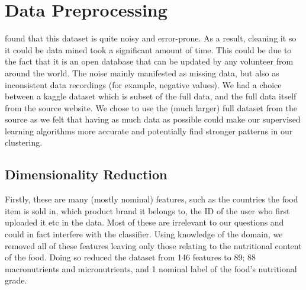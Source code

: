\documentclass[journal]{IEEEtran}
\begin{document}
\section{Data Preprocessing}
% 
% 
% 
% 
 found that this dataset is quite noisy and error-prone. As a result, cleaning it so it could be data mined took a significant amount of time. This could be due to the fact that it is an open database that can be updated by any volunteer from around the world. The noise mainly manifested as missing data, but also as inconsistent data recordings (for example, negative values). We had a choice between a kaggle dataset which is subset of the full data, and the full data itself from the source website. We chose to use the (much larger) full dataset from the source as we felt that having as much data as possible could make our supervised learning algorithms more accurate and potentially find stronger patterns in our clustering.

 

\subsection{Dimensionality Reduction}
Firstly, these are many (mostly nominal) features, such as the countries the food item is sold in, which product brand it belongs to, the ID of the user who first uploaded it etc in the data. Most of these are irrelevant to our questions and could in fact interfere with the classifier. Using knowledge of the domain, we removed all of these features leaving only those relating to the nutritional content of the food. Doing so reduced the dataset from 146 features to 89; 88 macronutrients and micronutrients, and 1 nominal label of the food’s nutritional grade.
\end{document}
